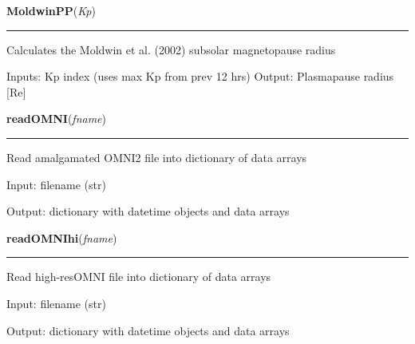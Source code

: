     \label{spacepy:utils:MoldwinPP}

    \vspace{0.5ex}

\hspace{.8\funcindent}\begin{boxedminipage}{\funcwidth}

    \raggedright \textbf{MoldwinPP}(\textit{Kp})

    \vspace{-1.5ex}

    \rule{\textwidth}{0.5\fboxrule}
\setlength{\parskip}{2ex}
    Calculates the Moldwin et al. (2002) subsolar magnetopause radius

    Inputs: Kp index (uses max Kp from prev 12 hrs) Output: Plasmapause 
    radius [Re]

\setlength{\parskip}{1ex}
    \end{boxedminipage}

    \label{spacepy:utils:readOMNI}

    \vspace{0.5ex}

\hspace{.8\funcindent}\begin{boxedminipage}{\funcwidth}

    \raggedright \textbf{readOMNI}(\textit{fname})

    \vspace{-1.5ex}

    \rule{\textwidth}{0.5\fboxrule}
\setlength{\parskip}{2ex}
    Read amalgamated OMNI2 file into dictionary of data arrays

    Input: filename (str)

    Output: dictionary with datetime objects and data arrays

\setlength{\parskip}{1ex}
    \end{boxedminipage}

    \label{spacepy:utils:readOMNIhi}

    \vspace{0.5ex}

\hspace{.8\funcindent}\begin{boxedminipage}{\funcwidth}

    \raggedright \textbf{readOMNIhi}(\textit{fname})

    \vspace{-1.5ex}

    \rule{\textwidth}{0.5\fboxrule}
\setlength{\parskip}{2ex}
    Read high-resOMNI file into dictionary of data arrays

    Input: filename (str)

    Output: dictionary with datetime objects and data arrays

\setlength{\parskip}{1ex}
    \end{boxedminipage}

